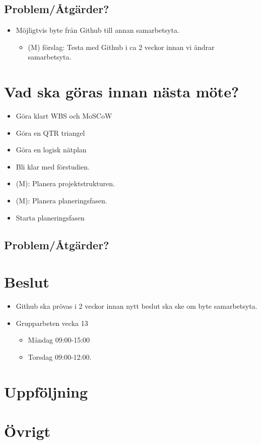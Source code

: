 \subsection*{Problem/Åtgärder?}
\begin{itemize}[noitemsep]
    \item Möjligtvis byte från Github till annan samarbetsyta.
    \begin{itemize}[noitemsep]
        \item (M) förslag: Testa med Github i ca 2 veckor innan vi ändrar samarbetsyta.
    \end{itemize}
\end{itemize}

\section*{Vad ska göras innan nästa möte?}
\begin{itemize}[noitemsep]
    \item Göra klart WBS och MoSCoW
    \item Göra en QTR triangel
    \item Göra en logisk nätplan
    \item Bli klar med förstudien.
    \item (M): Planera projektstrukturen.
    \item (M): Planera planeringsfasen.
    \item Starta planeringsfasen

\end{itemize}

\subsection*{Problem/Åtgärder?}

\newpage

\section*{Beslut}
\begin{itemize}[noitemsep]
    \item Github ska prövas i 2 veckor innan nytt beslut ska ske om byte samarbetsyta.
    \item Grupparbeten vecka 13
    \begin{itemize}[noitemsep]
        \item Måndag 09:00-15:00
        \item Torsdag 09:00-12:00.
    \end{itemize}
\end{itemize}

\section*{Uppföljning}

\section*{Övrigt}